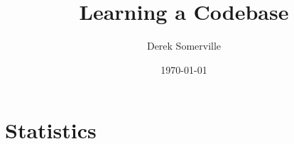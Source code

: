 \documentclass{article}
\title{Learning a Codebase}
\author{Derek Somerville}
\date{\today}
\begin{document}
\maketitle

\newpage 
\tableofcontents  %
\newpage 
\section{Statistics}






%
\end{document}

